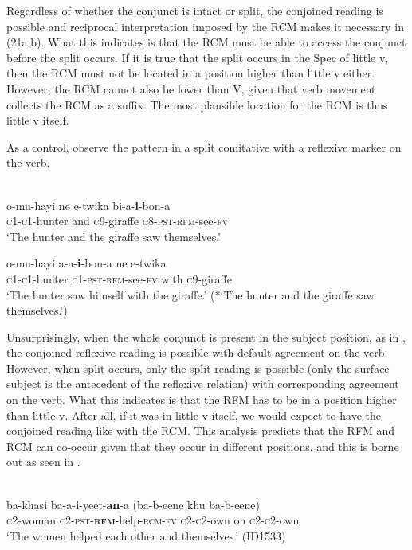 \documentclass[output=paper]{langsci/langscibook}
\begin{document}
Regardless of whether the conjunct is intact or split, the conjoined reading is possible and reciprocal interpretation imposed by the RCM makes it necessary in (21a,b). What this indicates is that the RCM must be able to access the conjunct before the split occurs. If it is true that the split occurs in the Spec of little v, then the RCM must not be located in a position higher than little v either. However, the RCM cannot also be lower than V, given that verb movement collects the RCM as a suffix. The most plausible location for the RCM is thus little v itself. 

As a control, observe the pattern in a split comitative with a reflexive marker on the verb. 


\ea\label{ex:safir:22}
  \\
\ea\label{ex:safir:22a}
\gll  o-mu-hayi   ne   e-twika   bi-a-\textbf{{i}}{-bon-a}  \\
       \textsc{c1-c1}-hunter   and   \textsc{c}9-giraffe   \textsc{c}8-\textsc{pst-}\textsc{rfm}-see-\textsc{fv} \\
\glt   ‘The hunter and the giraffe saw themselves.’

\ex\label{ex:safir:22b}
\gll  o-mu-hayi   a-a-\textbf{i}-bon-a     ne   e-twika \\
       \textsc{c1-c1}-hunter  \textsc{c}1-\textsc{pst-}\textsc{rfm}-see-\textsc{fv}   with   \textsc{c}9-giraffe \\
\glt   ‘The hunter saw himself with the giraffe.’
\glt   (*‘The hunter and the giraffe saw themselves.’)
\z
\z

Unsurprisingly, when the whole conjunct is present in the subject position, as in , the conjoined reflexive reading is possible with default agreement on the verb. However, when split occurs, only the split reading is possible (only the surface subject is the antecedent of the reflexive relation) with corresponding agreement on the verb. What this indicates is that the RFM has to be in a position higher than little v. After all, if it was in little v itself, we would expect  to have the conjoined reading like with the RCM. This analysis predicts that the RFM and RCM can co-occur given that they occur in different positions, and this is borne out as seen in .


\ea\label{ex:safir:23}
  \\
\gll ba-khasi   ba-a-\textbf{i}-yeet-\textbf{an}-a     (ba-b-eene khu ba-b-eene) \\
\textsc{c}2-woman   \textsc{c2-pst-}\textbf{\textsc{rfm}}-help-\textsc{rcm}\textsc{-fv}   \textsc{c2-c}2-own on  \textsc{c2-c2}-own\\
\glt ‘The women helped each other and themselves.’ (ID1533)
\z
\end{document}
